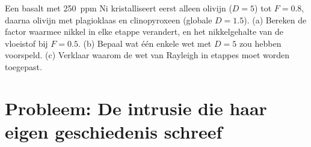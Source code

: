 \begin{exercise}[$\star\star\star$]\label{exo:b2:magmatic-differentiation:12}
Een basalt met \qty{250}{ppm} Ni kristalliseert eerst alleen olivijn ($D = 5$) tot
$F = 0.8$, daarna olivijn met plagioklaas en clinopyroxeen (globale $D = 1.5$). (a)
Bereken de factor waarmee nikkel in elke etappe verandert, en het nikkelgehalte van
de vloeistof bij $F = 0.5$. (b) Bepaal wat één enkele wet met $D = 5$ zou hebben voorspeld.
(c) Verklaar waarom de wet van Rayleigh in etappes moet worden toegepast.
\end{exercise}

\section{Probleem: De intrusie die haar eigen geschiedenis schreef}

